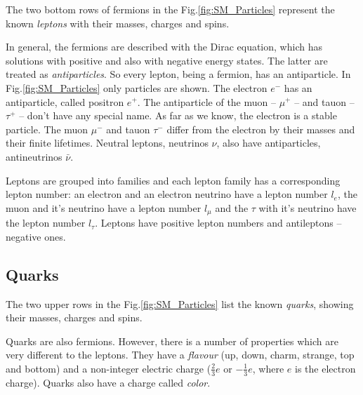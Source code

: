 The two bottom rows of fermions in the Fig.\ref{fig:SM_Particles} represent the known \textit{leptons} with their masses, charges
and spins. 

In general, the fermions are described with the Dirac equation\cite{diraceq}, which has 
% 
% 
solutions with positive and also with negative energy states. The latter are treated
as \textit{antiparticles}. So every lepton, being a fermion, has an antiparticle. In Fig.\ref{fig:SM_Particles}
only particles are shown. The electron $e^{-}$ has an antiparticle, called positron $e^{+}$. The antiparticle of the muon -- $\mu^{+}$ --
and tauon -- $\tau^{+}$ -- don't have any special name. As far as we know,
the electron is a stable particle. The muon $\mu^{-}$ and tauon $\tau^{-}$ differ from the electron by their masses and their 
finite lifetimes. Neutral leptons, neutrinos $\nu$, also have antiparticles, antineutrinos $\bar{\nu}$. 

Leptons are grouped into families and each lepton family has a corresponding lepton number: an electron and an electron neutrino 
have a lepton number $l_{e}$, the muon and it's neutrino have a lepton number $l_{\mu}$ and the $\tau$ with it's neutrino have the 
lepton number $l_{\tau}$.  Leptons have positive lepton numbers and antileptons -- negative ones.

\subsection{Quarks}\label{sec:quark}

The two upper rows in the Fig.\ref{fig:SM_Particles} list the known \textit{quarks}, showing their masses, charges and spins.

Quarks are also fermions. However, there is a number of properties which are very different
to the leptons. They have  a \textit{flavour} (up, down, charm, strange, top and bottom) and a non-integer electric charge 
($\frac{2}{3} e$ or $-\frac{1}{3} e$, where $e$ is the electron charge).
Quarks also have a charge called \textit{color}. 

